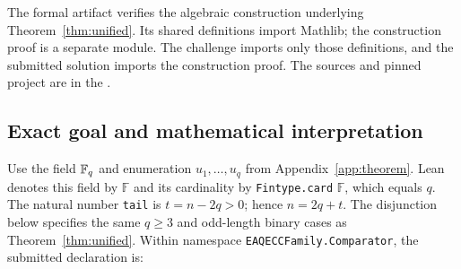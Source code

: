 The formal artifact verifies the algebraic construction underlying
Theorem~\ref{thm:unified}. Its shared definitions import Mathlib; the
construction proof is a separate module. The challenge imports only
those definitions, and the submitted solution imports the construction
proof. The sources and pinned project are in the \artifactlink{}.


\subsection{Exact goal and mathematical interpretation}\label{app:lean-theorem}
Use the field $\mathbb{F}_q$ and enumeration $u_1,\ldots,u_q$ from
Appendix~\ref{app:theorem}. Lean denotes this field by $\mathbb F$ and
its cardinality by \texttt{Fintype.card} $\mathbb F$, which equals $q$.
The natural number \texttt{tail} is $t=n-2q>0$; hence $n=2q+t$.
The disjunction below specifies the same $q\ge3$ and odd-length binary
cases as Theorem~\ref{thm:unified}. Within namespace \texttt{EAQECCFamily.Comparator}, the
submitted declaration is:



